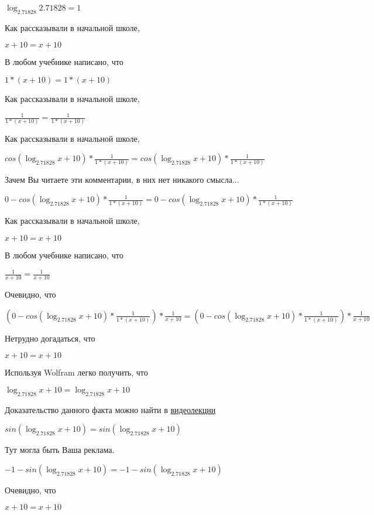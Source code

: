 \documentclass[12pt,a4paper,fleqn]{article}
\theoremstyle{definition}
\begin{document}
$\log_{ 2.71828 }{ 2.71828 } =  1 $

Как рассказывали в начальной школе,

$ x  +  10  =  x  +  10 $

В любом учебнике написано, что

$ 1  * ( x  +  10 ) =  1  * ( x  +  10 )$

Как рассказывали в начальной школе,

$\frac{ 1 }{ 1  * ( x  +  10 )}
 = \frac{ 1 }{ 1  * ( x  +  10 )}
$

Как рассказывали в начальной школе,

$cos(\log_{ 2.71828 }{ x  +  10 }) * \frac{ 1 }{ 1  * ( x  +  10 )}
 = cos(\log_{ 2.71828 }{ x  +  10 }) * \frac{ 1 }{ 1  * ( x  +  10 )}
$

Зачем Вы читаете эти комментарии, в них нет никакого смысла...

$ 0  - cos(\log_{ 2.71828 }{ x  +  10 }) * \frac{ 1 }{ 1  * ( x  +  10 )}
 =  0  - cos(\log_{ 2.71828 }{ x  +  10 }) * \frac{ 1 }{ 1  * ( x  +  10 )}
$

Как рассказывали в начальной школе,

$ x  +  10  =  x  +  10 $

В любом учебнике написано, что

$\frac{ 1 }{ x  +  10 }
 = \frac{ 1 }{ x  +  10 }
$

Очевидно, что

$( 0  - cos(\log_{ 2.71828 }{ x  +  10 }) * \frac{ 1 }{ 1  * ( x  +  10 )}
) * \frac{ 1 }{ x  +  10 }
 = ( 0  - cos(\log_{ 2.71828 }{ x  +  10 }) * \frac{ 1 }{ 1  * ( x  +  10 )}
) * \frac{ 1 }{ x  +  10 }
$

Нетрудно догадаться, что

$ x  +  10  =  x  +  10 $

Используя Wolfram легко получить, что

$\log_{ 2.71828 }{ x  +  10 } = \log_{ 2.71828 }{ x  +  10 }$

Доказательство данного факта можно найти в \href{https://www.youtube.com/watch?v=dQw4w9WgXcQ}{видеолекции}

$sin(\log_{ 2.71828 }{ x  +  10 }) = sin(\log_{ 2.71828 }{ x  +  10 })$

Тут могла быть Ваша реклама.

$ -1  - sin(\log_{ 2.71828 }{ x  +  10 }) =  -1  - sin(\log_{ 2.71828 }{ x  +  10 })$

Очевидно, что

$ x  +  10  =  x  +  10 $
\end{document}
